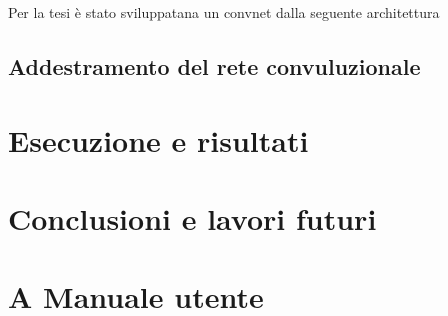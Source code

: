 \documentclass[14pt]{extarticle}
\begin{document}

Per la tesi è stato sviluppatana un convnet dalla seguente architettura 
\subsection{Addestramento del rete convuluzionale}




\section{Esecuzione e risultati}

\section{Conclusioni e lavori futuri}

\section{A Manuale utente}

\newpage
\printbibliography
\end{document}
